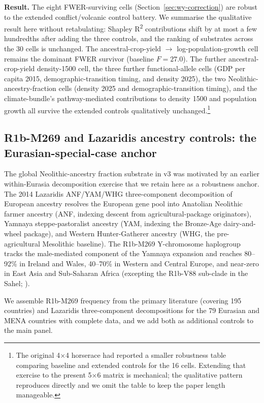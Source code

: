 \documentclass[11pt,letterpaper]{article}
\begin{document}
\textbf{Result.} The eight FWER-surviving cells (Section~\ref{sec:wy-correction}) are robust to the extended conflict/volcanic control battery. We summarise the qualitative result here without retabulating: Shapley R\textsuperscript{2} contributions shift by at most a few hundredths after adding the three controls, and the ranking of substrates across the 30 cells is unchanged. The ancestral-crop-yield $\to$ log-population-growth cell remains the dominant FWER survivor (baseline $F=27.0$). The further ancestral-crop-yield density-1500 cell, the three further functional-allele cells (GDP per capita 2015, demographic-transition timing, and density 2025), the two Neolithic-ancestry-fraction cells (density 2025 and demographic-transition timing), and the climate-bundle's pathway-mediated contributions to density 1500 and population growth all survive the extended controls qualitatively unchanged.\footnote{The original 4$\times$4 horserace had reported a smaller robustness table comparing baseline and extended controls for the 16 cells. Extending that exercise to the present 5$\times$6 matrix is mechanical; the qualitative pattern reproduces directly and we omit the table to keep the paper length manageable.}

\subsection{R1b-M269 and Lazaridis ancestry controls: the Eurasian-special-case anchor}
\label{sec:genetic-controls}

The global Neolithic-ancestry fraction substrate in v3 was motivated by an earlier within-Eurasia decomposition exercise that we retain here as a robustness anchor. The 2014 Lazaridis ANF/YAM/WHG three-component decomposition of European ancestry \citep{lazaridis2014,haak2015,allentoft2015} resolves the European gene pool into Anatolian Neolithic farmer ancestry (ANF, indexing descent from agricultural-package originators), Yamnaya steppe-pastoralist ancestry (YAM, indexing the Bronze-Age dairy-and-wheel package), and Western Hunter-Gatherer ancestry (WHG, the pre-agricultural Mesolithic baseline). The R1b-M269 Y-chromosome haplogroup tracks the male-mediated component of the Yamnaya expansion \citep{myres2011,balaresque2010,underhill2014} and reaches 80--92\% in Ireland and Wales, 40--70\% in Western and Central Europe, and near-zero in East Asia and Sub-Saharan Africa (excepting the R1b-V88 sub-clade in the Sahel; \citealt{cruciani2010}).

We assemble R1b-M269 frequency from the primary literature (covering 195 countries) and Lazaridis three-component decompositions for the 79 Eurasian and MENA countries with complete data, and we add both as additional controls to the main panel.
\end{document}
